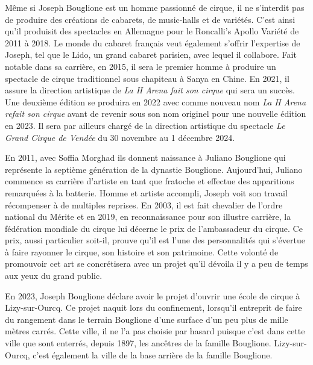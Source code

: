 Même si Joseph Bouglione est un homme passionné de cirque, il ne s’interdit pas de produire des créations de cabarets, de music-halls et de variétés. C’est ainsi qu’il produisit des spectacles en Allemagne pour le Roncalli’s Apollo Variété de 2011 à 2018. Le monde du cabaret français veut également s’offrir l’expertise de Joseph, tel que le Lido, un grand cabaret parisien, avec lequel il collabore. Fait notable dans sa carrière, en 2015, il sera le premier homme à produire un spectacle de cirque traditionnel sous chapiteau à Sanya en Chine. En 2021, il assure la direction artistique de \textit{La H Arena fait son cirque} qui sera un succès. Une deuxième édition se produira en 2022 avec comme nouveau nom \textit{La H Arena refait son cirque} avant de revenir sous son nom originel pour une nouvelle édition en 2023. Il sera par ailleurs chargé de la direction artistique du spectacle \textit{Le Grand Cirque de Vendée} du 30 novembre au 1 décembre 2024.

En 2011, avec Soffia Morghad ils donnent naissance à Juliano Bouglione qui représente la septième génération de la dynastie Bouglione. Aujourd’hui, Juliano commence sa carrière d’artiste en tant que fratoche et effectue des apparitions remarquées à la batterie. Homme et artiste accompli, Joseph voit son travail récompenser à de multiples reprises. En 2003, il est fait chevalier de l’ordre national du Mérite et en 2019, en reconnaissance pour son illustre carrière, la fédération mondiale du cirque lui décerne le prix de l’ambassadeur du cirque. Ce prix, aussi particulier soit-il, prouve qu'il est l’une des personnalités qui s’évertue à faire rayonner le cirque, son histoire et son patrimoine. Cette volonté de promouvoir cet art se concrétisera avec un projet qu’il dévoila il y a peu de temps aux yeux du grand public.

En 2023, Joseph Bouglione déclare avoir le projet d'ouvrir une école de cirque à Lizy-sur-Ourcq. Ce projet naquit lors du confinement, lorsqu’il entreprit de faire du rangement dans le terrain Bouglione d’une surface d’un peu plus de mille mètres carrés. Cette ville, il ne l’a pas choisie par hasard puisque c’est dans cette ville que sont enterrés, depuis 1897, les ancêtres de la famille Bouglione. Lizy-sur-Ourcq, c’est également la ville de la base arrière de la famille Bouglione. 

